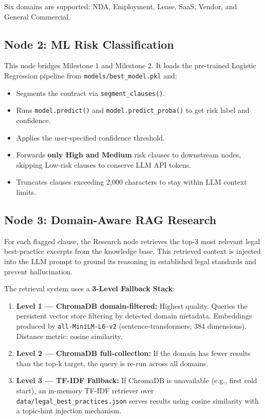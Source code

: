 \documentclass[12pt,a4paper]{article}
\begin{document}
Six domains are supported: NDA, Employment, Lease, SaaS, Vendor, and General Commercial.

\subsection{Node 2: ML Risk Classification}

This node bridges Milestone 1 and Milestone 2. It loads the pre-trained Logistic
Regression pipeline from \texttt{models/best\_model.pkl} and:

\begin{itemize}[leftmargin=1.5cm]
    \item Segments the contract via \texttt{segment\_clauses()}.
    \item Runs \texttt{model.predict()} and \texttt{model.predict\_proba()} to get
    risk label and confidence.
    \item Applies the user-specified confidence threshold.
    \item Forwards \textbf{only High and Medium} risk clauses to downstream nodes,
    skipping Low-risk clauses to conserve LLM API tokens.
    \item Truncates clauses exceeding 2,000 characters to stay within LLM context limits.
\end{itemize}

\subsection{Node 3: Domain-Aware RAG Research}

For each flagged clause, the Research node retrieves the top-3 most relevant legal
best-practice excerpts from the knowledge base. This retrieved context is injected
into the LLM prompt to ground its reasoning in established legal standards and
prevent hallucination.

The retrieval system uses a \textbf{3-Level Fallback Stack}:

\begin{enumerate}
    \item \textbf{Level 1 --- ChromaDB domain-filtered:} Highest quality. Queries
    the persistent vector store filtering by detected domain metadata. Embeddings
    produced by \texttt{all-MiniLM-L6-v2} (sentence-transformers; 384 dimensions).
    Distance metric: cosine similarity.

    \item \textbf{Level 2 --- ChromaDB full-collection:} If the domain has fewer
    results than the top-k target, the query is re-run across all domains.

    \item \textbf{Level 3 --- TF-IDF Fallback:} If ChromaDB is unavailable (e.g.,
    first cold start), an in-memory TF-IDF retriever over
    \texttt{data/legal\_best\_practices.json} serves results using cosine similarity
    with a topic-hint injection mechanism.
\end{enumerate}
\end{document}
